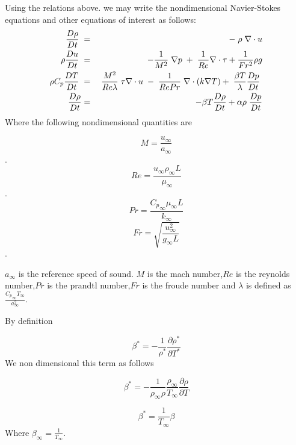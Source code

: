 Using the relations above. we may write the nondimensional
Navier-Stokes equations and other equations of interest as follows:
\begin{eqnarray}
\frac{D \rho}{D t}\hspace{1mm} &=& -\hspace{1mm}\rho \hspace{1mm}\nabla \cdot u \\
\rho \frac{D u}{D t} \hspace{1mm} &=& -\frac{1}{M^2}\hspace{1mm}\nabla p\hspace{1mm}+\hspace{1mm}\frac{1}{Re}\nabla \cdot \tau + \frac{1}{Fr^2}\rho g \\
\rho C_p \frac{D T}{D t} \hspace{1mm}&=&\hspace{1mm} \frac{M^2}{Re \lambda}\hspace{1mm}\tau \nabla \cdot u \hspace{1mm}-\hspace{1mm}\frac{1}{Re Pr} \hspace{1mm}\nabla \cdot (k \nabla T) + \hspace{1mm} \frac{\beta T}{\lambda} \frac{D p}{D t}\hspace{1mm} \\
\frac{D \rho}{D t} &=& \hspace{1mm} - \beta T \frac{D \rho}{D t} + \alpha \rho \hspace{1mm}\frac{D p}{D t}
\end{eqnarray}
Where the following nondimensional quantities are

$$M= \frac{u_\infty}{a_\infty}$$. 
$$Re= \frac{u_\infty \rho_\infty L}{\mu_\infty}$$. 
$$Pr= \frac{{C_p}_\infty \mu_\infty L}{k_\infty}$$
$$Fr= \sqrt{\frac{u_\infty^2} {g_\infty L}}$$. 

\noindent $a_{\infty}$ is the reference speed of sound. $M$ is the mach number,$Re$ is the reynolds number,$Pr$ is the prandtl number,$Fr$ is the froude number and $\lambda$ is defined as $\frac{{C_p}_\infty T_\infty }{a^2_\infty}$. 

\noindent By definition 

$$\beta^*= -\frac{1}{\rho^*}\frac{\partial \rho^*}{\partial T^*}$$ We non dimensional this term as follows 

$$\beta^*= -\frac{1}{\rho_\infty \rho}\frac{\rho_\infty}{T_\infty}\frac{\partial \rho}{\partial T}$$

$$\beta^*= \frac{1}{T_\infty } \beta$$ Where $\beta_\infty = \frac{1}{T_\infty}$. 
\bigskip

